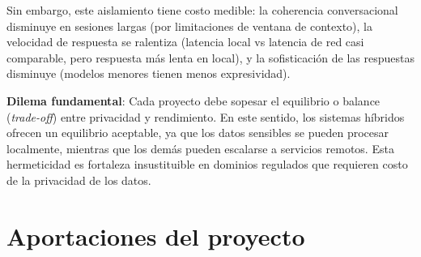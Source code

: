 \documentclass[12pt,a4paper]{report}
\numberwithin{figure}{section}
\begin{document}
Sin embargo, este aislamiento tiene costo medible: la coherencia conversacional disminuye en sesiones largas (por limitaciones de ventana de contexto), la velocidad de respuesta se ralentiza (latencia local vs latencia de red casi comparable, pero respuesta más lenta en local), y la sofisticación de las respuestas disminuye (modelos menores tienen menos expresividad).

\textbf{Dilema fundamental}: Cada proyecto debe sopesar el equilibrio o balance (\textit{trade-off}) entre privacidad y rendimiento. En este sentido, los sistemas híbridos ofrecen un equilibrio aceptable, ya que los datos sensibles se pueden procesar localmente, mientras que los demás pueden escalarse a servicios remotos. Esta hermeticidad es fortaleza insustituible en dominios regulados que requieren costo de la privacidad de los datos.

\vspace{1em}

\section{Aportaciones del proyecto}
\label{sec:aportaciones_proyecto}
\end{document}
